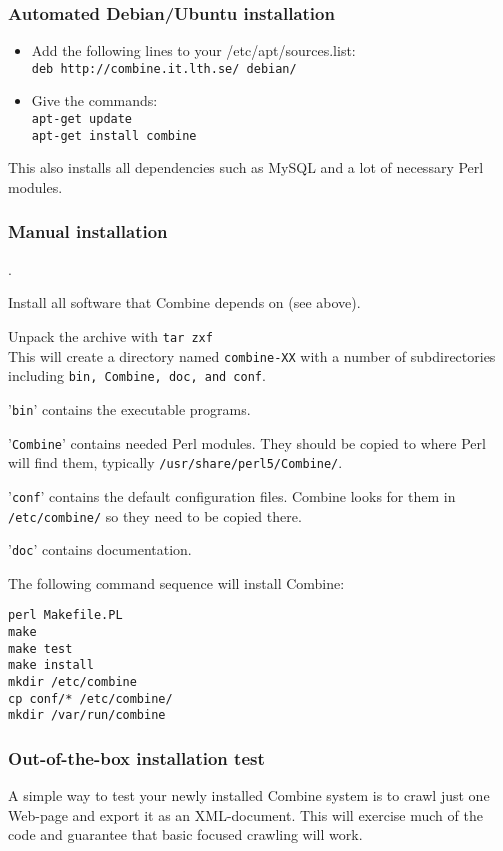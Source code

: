 \subsubsection{Automated Debian/Ubuntu installation}
\label{debian}
\begin{itemize}
\item Add the following lines to your /etc/apt/sources.list:\\
{\tt deb http://combine.it.lth.se/ debian/}
\item Give the commands:\\
{\tt apt-get update\\
apt-get install combine}
\end{itemize}
This also installs all dependencies such as MySQL and a lot of necessary
Perl modules.

\subsubsection{Manual installation}

.

Install all software that Combine depends on (see above).

Unpack the archive with {\tt  tar zxf }\\
This will create a directory named {\tt combine-XX} with
a number of subdirectories including {\tt bin, Combine, doc, and conf}.

'{\tt bin}' contains the executable programs.

'{\tt Combine}' contains needed Perl modules. They should be copied to
where Perl will find them, typically {\tt /usr/share/perl5/Combine/}.

'{\tt conf}' contains the default configuration files. Combine looks for them
in {\tt /etc/combine/} so they need to be copied there.

'{\tt doc}' contains documentation.

The following command sequence will install Combine:
\begin{verbatim}
perl Makefile.PL
make
make test
make install
mkdir /etc/combine
cp conf/* /etc/combine/
mkdir /var/run/combine
\end{verbatim}

\subsubsection{Out-of-the-box installation test}
A simple way to test your newly installed Combine system is
to crawl just one Web-page and export it as an XML-document. This will
exercise much of the code and guarantee that basic focused crawling will work.


